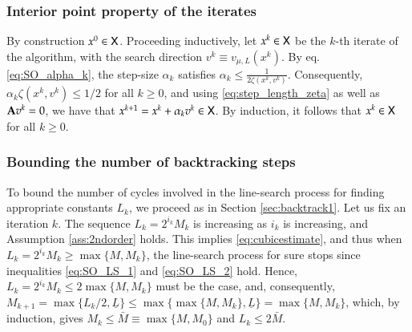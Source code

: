 \subsubsection{Interior point property of the iterates}
By construction $x^{0}\in\mathsf{X}$. Proceeding inductively, let $x^{k}\in\mathsf{X}$ be the $k$-th iterate of the algorithm, with the search direction $v^{k}\equiv v_{\mu,L}(x^{k})$.  By eq. \eqref{eq:SO_alpha_k}, the step-size $\alpha_k$ satisfies $\alpha_{k}\leq \frac{1}{2\zeta(x^{k},v^{k})}$. Consequently, $\alpha_{k}\zeta(x^{k},v^{k})\leq 1/2$ for all $k\geq 0$, and using \eqref{eq:step_length_zeta} as well as ${\mathbf A} v^{k} =0$, we have that $x^{k+1}=x^{k}+\alpha_{k}v^{k}\in\mathsf{X}$. By induction, it follows that $x^{k}\in\mathsf{X}$ for all $k\geq 0$.

\subsubsection{Bounding the number of backtracking steps}
\label{sec:backtrack2}
To bound the number of cycles involved in the line-search process for finding appropriate constants $L_{k}$, we proceed as in Section \ref{sec:backtrack1}. 
Let us fix an iteration $k$. The sequence $L_k = 2^{i_k} M_k$ is increasing as $i_k$ is increasing, and Assumption \ref{ass:2ndorder} holds. 
This implies \eqref{eq:cubicestimate}, and thus when $L_k = 2^{i_k} M_k \geq \max\{M,M_k\}$, the line-search process for sure stops since inequalities \eqref{eq:SO_LS_1} and \eqref{eq:SO_LS_2} hold.	
Hence, $L_k=2^{i_k} M_k \leq 2\max\{M,M_k\}$ must be the case, and, consequently, $M_{k+1}=\max\{L_k/2, \underline{L}\} \leq  \max\{\max\{M,M_k\}, \underline{L}\} = \max\{M,M_k\}$, which, by induction, gives $M_{k} \leq \bar{M}\equiv \max\{M,M_0\}$ and $L_k  \leq 2\bar{M}$. 
